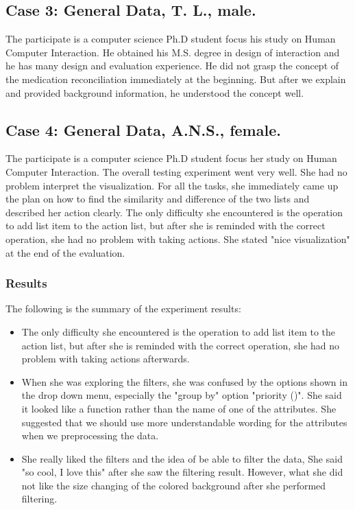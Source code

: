 \documentclass{chi2009}
\begin{document}
\subsection{Case 3: General Data, T. L., male.}
The participate is a computer science Ph.D student focus his study on Human Computer Interaction. He obtained his M.S. degree in design of interaction and he has many design and evaluation experience. He did not grasp the concept of the medication reconciliation immediately at the beginning. But after we explain and provided background information, he understood the concept well.   

\subsection{Case 4: General Data, A.N.S., female.}
The participate is a computer science Ph.D student focus her study on Human Computer Interaction. The overall testing experiment went very well. She had no problem interpret the visualization. For all the tasks, she immediately came up the plan on how to find the similarity and difference of the two lists and described her action clearly. The only difficulty she encountered is the operation to add list item to the action list, but after she is reminded with the correct operation, she had no problem with taking actions. She stated "nice visualization" at the end of the evaluation.
\subsubsection{Results}
The following is the summary of the experiment results:
\begin{itemize}
\item The only difficulty she encountered is the operation to add list item to the action list, but after she is reminded with the correct operation, she had no problem with taking actions afterwards.

\item When she was exploring the filters, she was confused by the options shown in the drop down menu, especially the "group by" option  "priority ()". She said it looked like a function rather than the name of one of the attributes. She suggested that we should use more understandable wording for the attributes when we preprocessing the data. 
\item She really liked the filters and the idea of be able to filter the data, She said "so cool, I love this" after she saw the filtering result. However, what she did not like the size changing of the colored background after she performed filtering. 

\end{itemize}
\end{document}
